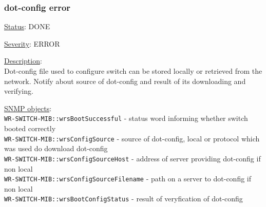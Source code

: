 \subsubsection{\bf dot-config error}
		\label{fail:other:dot-config}
		\begin{packed_enum}
			\item [] \underline{Status}: DONE
			\item [] \underline{Severity}: ERROR
			\item [] \underline{Description}:\\
				Dot-config file used to configure switch can be stored locally or retrieved from the network.
				Notify about source of dot-config and result of its downloading and verifying.
			\item [] \underline{SNMP objects}:\\
				\texttt{WR-SWITCH-MIB::wrsBootSuccessful} - status word informing whether switch booted correctly\\
				\texttt{WR-SWITCH-MIB::wrsConfigSource} - source of dot-config, local or protocol which was used do download dot-config\\
				\texttt{WR-SWITCH-MIB::wrsConfigSourceHost} - address of server providing dot-config if non local\\
				\texttt{WR-SWITCH-MIB::wrsConfigSourceFilename} - path on a server to dot-config if non local\\
				\texttt{WR-SWITCH-MIB::wrsBootConfigStatus} - result of veryfication of dot-config
		\end{packed_enum}

